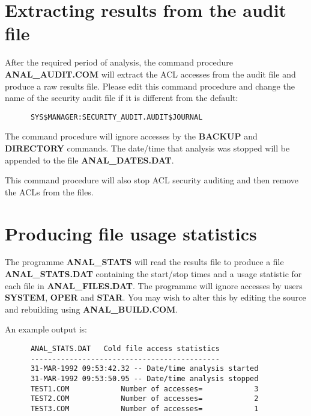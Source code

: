 \section{Extracting results from the audit file}

After the required period of analysis, the command procedure {\bf
ANAL\_AUDIT.COM} will extract the ACL accesses from the audit file and produce
a raw results file. Please edit this command procedure  and change the name of
the security audit file if it is different from the default:

\begin{verbatim}
      SYS$MANAGER:SECURITY_AUDIT.AUDIT$JOURNAL
\end{verbatim}

The command procedure will ignore accesses by the {\bf BACKUP} and {\bf
DIRECTORY} commands. The date/time that analysis was stopped will be appended
to the file {\bf ANAL\_DATES.DAT}.

This command procedure will also stop ACL security auditing and then remove the
ACLs from the files.

\section{Producing file usage statistics}

The programme {\bf ANAL\_STATS} will read the results file to produce a file
{\bf ANAL\_STATS\-.DAT} containing the start/stop times and a usage statistic
for each file in {\bf ANAL\_FILES\-.DAT}. The programme will ignore accesses by
users {\bf SYSTEM}, {\bf OPER} and {\bf STAR}. You may wish to alter this by
editing the source and rebuilding using {\bf ANAL\_BUILD.COM}.

An example output is:
\begin{verbatim}
      ANAL_STATS.DAT   Cold file access statistics
      --------------------------------------------
      31-MAR-1992 09:53:42.32 -- Date/time analysis started
      31-MAR-1992 09:53:50.95 -- Date/time analysis stopped
      TEST1.COM            Number of accesses=            3
      TEST2.COM            Number of accesses=            2
      TEST3.COM            Number of accesses=            1
\end{verbatim}


